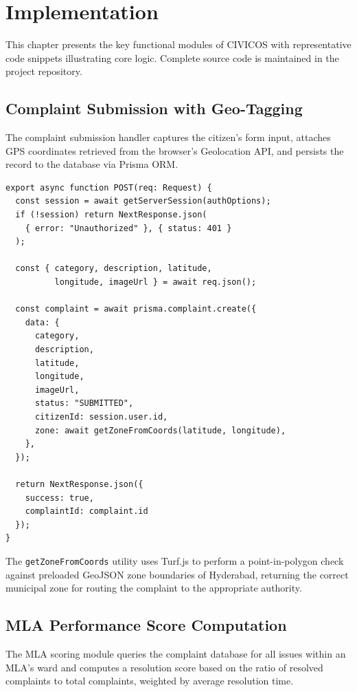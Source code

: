 \documentclass[12pt,a4paper]{report}
\begin{document}
\chapter[IMPLEMENTATION]{Implementation}

This chapter presents the key functional modules of CIVICOS with
representative code snippets illustrating core logic. Complete source code
is maintained in the project repository.

\lstset{
  basicstyle=\ttfamily\footnotesize,
  backgroundcolor=,
  frame=single,
  framerule=0.8pt,
  rulecolor=,
  numbers=left,
  numberstyle=\tiny,
  numbersep=8pt,
  breaklines=true,
  language=Java,
  keywordstyle=\bfseries,
  stringstyle=,
  commentstyle=\itshape,
  showstringspaces=false,
  tabsize=2,
  captionpos=b,
  xleftmargin=12pt,
  xrightmargin=4pt,
  aboveskip=10pt,
  belowskip=10pt,
}

\section{Complaint Submission with Geo-Tagging}
The complaint submission handler captures the citizen's form input, attaches
GPS coordinates retrieved from the browser's Geolocation API, and persists
the record to the database via Prisma ORM.

\begin{lstlisting}[caption={}]
export async function POST(req: Request) {
  const session = await getServerSession(authOptions);
  if (!session) return NextResponse.json(
    { error: "Unauthorized" }, { status: 401 }
  );

  const { category, description, latitude,
          longitude, imageUrl } = await req.json();

  const complaint = await prisma.complaint.create({
    data: {
      category,
      description,
      latitude,
      longitude,
      imageUrl,
      status: "SUBMITTED",
      citizenId: session.user.id,
      zone: await getZoneFromCoords(latitude, longitude),
    },
  });

  return NextResponse.json({
    success: true,
    complaintId: complaint.id
  });
}
\end{lstlisting}

The \texttt{getZoneFromCoords} utility uses Turf.js to perform a
point-in-polygon check against preloaded GeoJSON zone boundaries of
Hyderabad, returning the correct municipal zone for routing the complaint
to the appropriate authority.

\section{MLA Performance Score Computation}
The MLA scoring module queries the complaint database for all issues within
an MLA's ward and computes a resolution score based on the ratio of resolved
complaints to total complaints, weighted by average resolution time.
\end{document}
